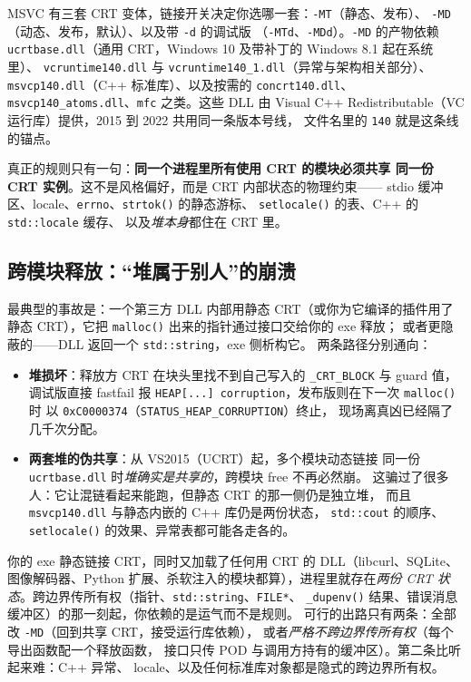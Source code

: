 \documentclass[12pt,a4paper,fontset=fandol]{ctexbook}
\newcommand{\Fn}[1]{\texttt{#1()}}
\newcommand{\Tp}[1]{\texttt{#1}}
\newcommand{\Short}[1]{\texttt{-#1}}
\newcommand{\Bk}{\allowbreak}
\begin{document}
MSVC 有三套 CRT 变体，链接开关决定你选哪一套：\Short{MT}（静态、发布）、
\Short{MD}（动态、发布，默认）、以及带 \Short{d} 的调试版
（\Short{MTd}、\Short{MDd}）。\Short{MD} 的产物依赖
\Tp{ucrtbase.dll}（通用 CRT，Windows 10 及带补丁的 Windows 8.1 起在系统里）、
\Tp{vcruntime140.dll} 与 \Tp{vcruntime140\Bk\_1.dll}（异常与架构相关部分）、
\Tp{msvcp140.dll}（C++ 标准库）、以及按需的 \Tp{concrt140.dll}、
\Tp{msvcp140\Bk\_atoms.dll}、\Tp{mfc} 之类。这些 DLL 由
Visual C++ Redistributable（VC 运行库）提供，2015 到 2022 共用同一条版本号线，
文件名里的 \Tp{140} 就是这条线的锚点。

真正的规则只有一句：\textbf{同一个进程里所有使用 CRT 的模块必须共享
同一份 CRT 实例}。这不是风格偏好，而是 CRT 内部状态的物理约束——
stdio 缓冲区、locale、\Tp{errno}、\Fn{strtok} 的静态游标、
\Fn{setlocale} 的表、C++ 的 \Tp{std::locale} 缓存、
以及\emph{堆本身}都住在 CRT 里。

\subsection{跨模块释放：``堆属于别人''的崩溃}

最典型的事故是：一个第三方 DLL 内部用静态 CRT（或你为它编译的插件用了
静态 CRT），它把 \Fn{malloc} 出来的指针通过接口交给你的 exe 释放；
或者更隐蔽的——DLL 返回一个 \Tp{std::string}，exe 侧析构它。
两条路径分别通向：

\begin{itemize}
\item \textbf{堆损坏}：释放方 CRT 在块头里找不到自己写入的
\Tp{\_CRT\_BLOCK} 与 guard 值，调试版直接 fastfail 报
\lstinline|HEAP[...] corruption|，发布版则在下一次 \Fn{malloc} 时
以 \Tp{0xC0000374}（\Tp{STATUS\_HEAP\_CORRUPTION}）终止，
现场离真凶已经隔了几千次分配。
\item \textbf{两套堆的伪共享}：从 VS2015（UCRT）起，多个模块动态链接
同一份 \Tp{ucrtbase.dll} 时\emph{堆确实是共享的}，跨模块 free 不再必然崩。
这骗过了很多人：它让混链看起来能跑，但静态 CRT 的那一侧仍是独立堆，
而且 \Tp{msvcp140.dll} 与静态内嵌的 C++ 库仍是两份状态，
\Tp{std::cout} 的顺序、\Fn{setlocale} 的效果、异常表都可能各走各的。
\end{itemize}

\begin{warning}[title={只要依赖图里有一个 DLL 用 CRT，\Tp{/MT} 就通常是错的}]
你的 exe 静态链接 CRT，同时又加载了任何用 CRT 的 DLL（libcurl、SQLite、
图像解码器、Python 扩展、杀软注入的模块都算），进程里就存在\emph{两份
CRT 状态}。跨边界传所有权（指针、\Tp{std::string}、\Tp{FILE*}、
\Fn{\_dupenv} 结果、错误消息缓冲区）的那一刻起，你依赖的是运气而不是规则。
可行的出路只有两条：全部改 \Short{MD}（回到共享 CRT，接受运行库依赖），
或者\emph{严格不跨边界传所有权}（每个导出函数配一个释放函数，
接口只传 POD 与调用方持有的缓冲区）。第二条比听起来难：C++ 异常、
locale、以及任何标准库对象都是隐式的跨边界所有权。
\end{warning}
\end{document}
